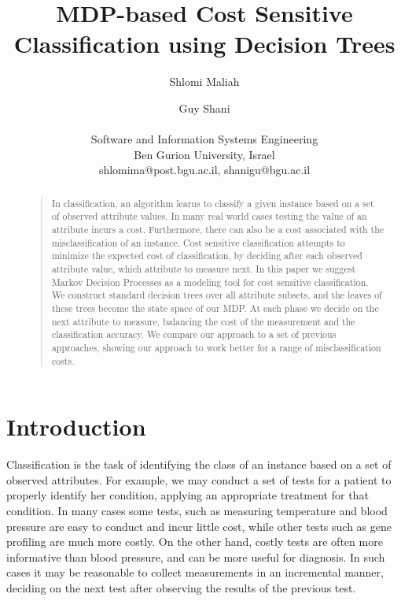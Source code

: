 \documentclass[letterpaper]{article}
\theoremstyle{definition}
\begin{document}
%
%
\title{MDP-based Cost Sensitive Classification using Decision Trees}

\author{Shlomi Maliah \and Guy Shani \\\\
Software and Information Systems Engineering\\
Ben Gurion University, Israel \\
shlomima@post.bgu.ac.il, shanigu@bgu.ac.il
}

\maketitle
\begin{abstract}
\begin{quote}
In classification, an algorithm learns to classify a given instance based on a set of observed attribute values. In many real world cases testing the value of an attribute incurs a cost. Furthermore, there can also be a cost associated with the misclassification of an instance. Cost sensitive classification attempts to minimize the expected cost of classification, by deciding after each observed attribute value, which attribute to measure next. In this paper we suggest Markov Decision Processes as a modeling tool for cost sensitive classification. We construct standard decision trees over all attribute subsets, and the leaves of these trees become the state space of our MDP. At each phase we decide on the next attribute to measure, balancing the cost of the measurement and the classification accuracy. We compare our approach to a set of previous approaches, showing our approach to work better for a range of misclassification costs.

\end{quote}
\end{abstract}


\section{Introduction}

Classification is the task of identifying the class of an instance based on a set of observed attributes. For example, we may conduct a set of tests for a patient to properly identify her condition, applying an appropriate treatment for that condition. In many cases some tests, such as measuring temperature and blood pressure are easy to conduct and incur little cost, while other tests such as gene profiling are much more costly. On the other hand, costly tests are often more informative than blood pressure, and can be more useful for diagnosis. In such cases it may be reasonable to collect measurements in an incremental manner, deciding on the next test after observing the results of the previous test.
\end{document}

